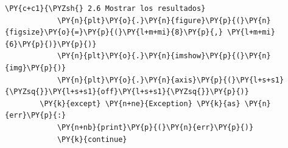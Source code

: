 \begin{tcolorbox}[breakable, size=fbox, boxrule=1pt, pad at break*=1mm,colback=cellbackground, colframe=cellborder, fontupper=\footnotesize]
\begin{Verbatim}[commandchars=\\\{\}]
            \PY{c+c1}{\PYZsh{} 2.6 Mostrar los resultados}
            \PY{n}{plt}\PY{o}{.}\PY{n}{figure}\PY{p}{(}\PY{n}{figsize}\PY{o}{=}\PY{p}{(}\PY{l+m+mi}{8}\PY{p}{,} \PY{l+m+mi}{6}\PY{p}{)}\PY{p}{)}
            \PY{n}{plt}\PY{o}{.}\PY{n}{imshow}\PY{p}{(}\PY{n}{img}\PY{p}{)}
            \PY{n}{plt}\PY{o}{.}\PY{n}{axis}\PY{p}{(}\PY{l+s+s1}{\PYZsq{}}\PY{l+s+s1}{off}\PY{l+s+s1}{\PYZsq{}}\PY{p}{)}
        \PY{k}{except} \PY{n+ne}{Exception} \PY{k}{as} \PY{n}{err}\PY{p}{:}
            \PY{n+nb}{print}\PY{p}{(}\PY{n}{err}\PY{p}{)}
            \PY{k}{continue}
    \end{Verbatim}
\end{tcolorbox}


